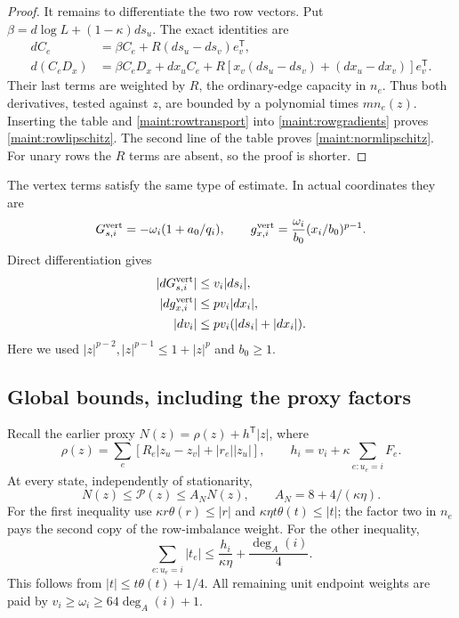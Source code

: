 \documentclass[11pt]{article}
\theoremstyle{definition}\newtheorem{definition}[theorem]{Definition}
\theoremstyle{remark}\newtheorem{remark}[theorem]{Remark}
\begin{document}
\begin{proof}
It remains to differentiate the two row vectors. Put
$\beta=d\log L+(1-\kappa)ds_u$. The exact identities are
\begin{align}
 dC_e&=\beta C_e+R(ds_u-ds_v)e_v^{\mathsf T},\nonumber\\
 d(C_eD_x)&=\beta C_eD_x+dx_uC_e
   +R[x_v(ds_u-ds_v)+(dx_u-dx_v)]e_v^{\mathsf T}.
 \label{maint:rowtransport}
\end{align}
Their last terms are weighted by $R$, the ordinary-edge capacity in
$n_e$. Thus both derivatives, tested against $z$, are bounded by a
polynomial times $m n_e(z)$. Inserting the table and
\eqref{maint:rowtransport} into \eqref{maint:rowgradients} proves
\eqref{maint:rowlipschitz}. The second line of the table proves
\eqref{maint:normlipschitz}. For unary rows the $R$ terms are absent,
so the proof is shorter.
\end{proof}

The vertex terms satisfy the same type of estimate. In actual
coordinates they are
\[
 G_{s,i}^{\rm vert}=-\omega_i(1+a_0/q_i),\qquad
 g_{x,i}^{\rm vert}=\frac{\omega_i}{b_0}(x_i/b_0)^{p-1}.
\]
Direct differentiation gives
\begin{equation}
 \begin{aligned}
 |dG_{s,i}^{\rm vert}|&\leq v_i|ds_i|,\\
 |dg_{x,i}^{\rm vert}|&\leq p v_i|dx_i|,\\
 |dv_i|&\leq p v_i(|ds_i|+|dx_i|).
 \end{aligned}
 \label{maint:vertexvariation}
\end{equation}
Here we used $|z|^{p-2},|z|^{p-1}\leq1+|z|^p$ and $b_0\geq1$.

\subsection{Global bounds, including the proxy factors}

Recall the earlier proxy $N(z)=\rho(z)+h^{\mathsf T}|z|$, where
\[
 \rho(z)=\sum_e[R_e|z_u-z_v|+|r_e||z_u|],\qquad
 h_i=v_i+\kappa\sum_{e:u_e=i}F_e.
\]
At every state, independently of stationarity,
\begin{equation}
 N(z)\leq\mathcal P(z)\leq A_N N(z),\qquad
 A_N=8+4/(\kappa\eta).
 \label{maint:proxycomparison}
\end{equation}
For the first inequality use
$\kappa r\theta(r)\leq|r|$ and
$\kappa\eta t\theta(t)\leq|t|$; the factor two in $n_e$ pays the
second copy of the row-imbalance weight. For the other inequality,
\[
 \sum_{e:u_e=i}|t_e|
 \leq\frac{h_i}{\kappa\eta}+\frac{\deg_A(i)}4.
\]
This follows from $|t|\leq t\theta(t)+1/4$. All remaining unit endpoint
weights are paid by $v_i\geq\omega_i\geq64\deg_A(i)+1$.
\end{document}
